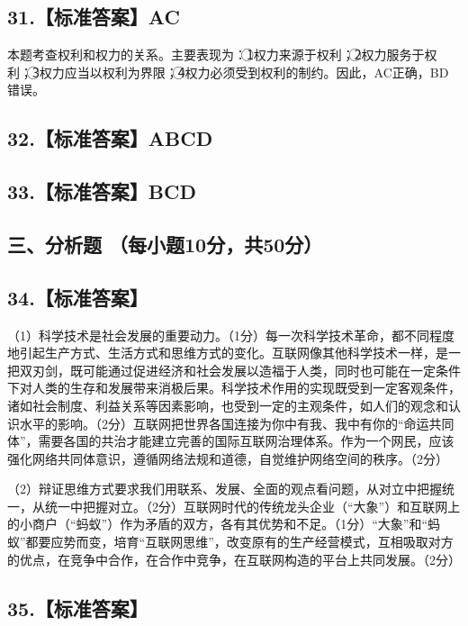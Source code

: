 \documentclass[UTF8,11pt]{ctexart}
\begin{document}
\subsection*{31.【标准答案】AC}

本题考查权利和权力的关系。主要表现为：\textcircled{1}权力来源于权利；\textcircled{2}权力服务于权利；\textcircled{3}权力应当以权利为界限；\textcircled{4}权力必须受到权利的制约。因此，AC正确，BD 错误。


\subsection*{32.【标准答案】ABCD}

\subsection*{33.【标准答案】BCD}

\subsection*{三、分析题 （每小题10分，共50分）}

\subsection*{34.【标准答案】}

（1）科学技术是社会发展的重要动力。（1分）每一次科学技术革命，都不同程度地引起生产方式、生活方式和思维方式的变化。互联网像其他科学技术一样，是一把双刃剑，既可能通过促进经济和社会发展以造福于人类，同时也可能在一定条件下对人类的生存和发展带来消极后果。科学技术作用的实现既受到一定客观条件，诸如社会制度、利益关系等因素影响，也受到一定的主观条件，如人们的观念和认识水平的影响。（2分）互联网把世界各国连接为你中有我、我中有你的“命运共同体”，需要各国的共治才能建立完善的国际互联网治理体系。作为一个网民，应该强化网络共同体意识，遵循网络法规和道德，自觉维护网络空间的秩序。（2分）


（2）辩证思维方式要求我们用联系、发展、全面的观点看问题，从对立中把握统一，从统一中把握对立。（2分）互联网时代的传统龙头企业（“大象”）和互联网上的小商户（“蚂蚁”）作为矛盾的双方，各有其优势和不足。（1分）“大象”和“蚂蚁”都要应势而变，培育“互联网思维”，改变原有的生产经营模式，互相吸取对方的优点，在竞争中合作，在合作中竞争，在互联网构造的平台上共同发展。（2分）


\subsection*{35.【标准答案】}
\end{document}
